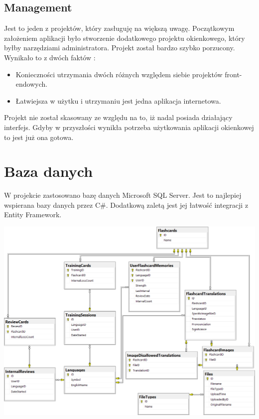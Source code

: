 \subsection{Management}

Jest to jeden z projektów, który zasługuję na większą uwagę. Początkowym założeniem aplikacji było stworzenie dodatkowego projektu okienkowego, który byłby narzędziami administratora. Projekt został bardzo szybko porzucony. Wynikało to z dwóch faktów :
\begin{itemize}
\setlength\itemsep{1mm}
	\item Konieczności utrzymania dwóch różnych względem siebie projektów front-endowych.
	\item Łatwiejsza w użytku  i utrzymaniu jest jedna aplikacja internetowa.
\end{itemize}
Projekt nie został skasowany ze względu na to, iż nadal posiada działający interfejs. Gdyby w przyszłości wynikła potrzeba użytkowania aplikacji okienkowej to jest już ona gotowa.




\section{Baza danych}

W projekcie zastosowano bazę danych Microsoft SQL Server. Jest to najlepiej wspierana bazy danych przez C\#. Dodatkową zaletą jest jej łatwość integracji z Entity Framework.
\begin{landscape}
\begin{center}
  \includegraphics[width=\textwidth]{images/erd.png}
\end{center}
\end{landscape}

